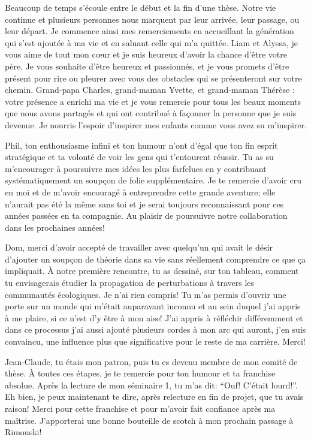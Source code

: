 Beaucoup de temps s'écoule entre le début et la fin d'une thèse. Notre
vie continue et plusieurs personnes nous marquent par leur arrivée, leur
passage, ou leur départ. Je commence ainsi mes remerciements en
accueillant la génération qui s'est ajoutée à ma vie et en saluant celle
qui m'a quittée. Liam et Alyssa, je vous aime de tout mon cœur et je
suis heureux d'avoir la chance d'être votre père. Je vous souhaite
d'être heureux et passionnés, et je vous promets d'être présent pour
rire ou pleurer avec vous des obstacles qui se présenteront sur votre
chemin. Grand-papa Charles, grand-maman Yvette, et grand-maman Thérèse :
votre présence a enrichi ma vie et je vous remercie pour tous les beaux
moments que nous avons partagés et qui ont contribué à façonner la
personne que je suis devenue. Je nourris l'espoir d'inspirer mes enfants
comme vous avez su m'inspirer.

Phil, ton enthousiasme infini et ton humour n'ont d'égal que ton fin
esprit stratégique et ta volonté de voir les gens qui t'entourent
réussir. Tu as su m'encourager à poursuivre mes idées les plus farfelues
en y contribuant systématiquement un soupçon de folie supplémentaire. Je
te remercie d'avoir cru en moi et de m'avoir encouragé à entreprendre
cette grande aventure; elle n'aurait pas été la même sans toi et je
serai toujours reconnaissant pour ces années passées en ta compagnie. Au
plaisir de poursuivre notre collaboration dans les prochaines années!

Dom, merci d'avoir accepté de travailler avec quelqu'un qui avait le
désir d'ajouter un soupçon de théorie dans sa vie sans réellement
comprendre ce que ça impliquait. À notre première rencontre, tu as
dessiné, sur ton tableau, comment tu envisagerais étudier la propagation
de perturbations à travers les communautés écologiques. Je n'ai rien
compris! Tu m'as permis d'ouvrir une porte sur un monde qui m'était
auparavant inconnu et au sein duquel j'ai appris à me plaire, si ce
n'est d'y être à mon aise! J'ai appris à réfléchir différemment et dans
ce processus j'ai aussi ajouté plusieurs cordes à mon arc qui auront,
j'en suis convaincu, une influence plus que significative pour le reste
de ma carrière. Merci!

Jean-Claude, tu étais mon patron, puis tu es devenu membre de mon comité
de thèse. À toutes ces étapes, je te remercie pour ton humour et ta
franchise absolue. Après la lecture de mon séminaire 1, tu m'as dit:
``Ouf! C'était lourd!''. Eh bien, je peux maintenant te dire, après
relecture en fin de projet, que tu avais raison! Merci pour cette
franchise et pour m'avoir fait confiance après ma maîtrise. J'apporterai
une bonne bouteille de scotch à mon prochain passage à Rimouski!

